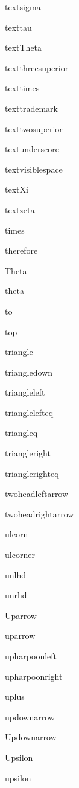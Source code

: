 \documentclass{article}
\begin{document}
textsigma    \textsigma{}

texttau    \texttau{}

textTheta    \textTheta{}

textthreesuperior    \textthreesuperior{}

texttimes    \texttimes{}

texttrademark    \texttrademark{}

texttwosuperior    \texttwosuperior{}

textunderscore    \textunderscore{}

textvisiblespace    \textvisiblespace{}

textXi    \textXi{}

textzeta    \textzeta{}

times    \times{}

therefore    \therefore{}

Theta    \Theta{}

theta    \theta{}

to    \to{}

top    \top{}

triangle    \triangle{}

triangledown    \triangledown{}

triangleleft    \triangleleft{}

trianglelefteq    \trianglelefteq{}

triangleq    \triangleq{}

triangleright    \triangleright{}

trianglerighteq    \trianglerighteq{}

twoheadleftarrow    \twoheadleftarrow{}

twoheadrightarrow    \twoheadrightarrow{}


ulcorn    \ulcorn{}

ulcorner    \ulcorner{}

unlhd    \unlhd{}

unrhd    \unrhd{}

Uparrow    \Uparrow{}

uparrow    \uparrow{}

upharpoonleft    \upharpoonleft{}

upharpoonright    \upharpoonright{}

uplus    \uplus{}

updownarrow    \updownarrow{}

Updownarrow    \Updownarrow{}

Upsilon    \Upsilon{}

upsilon    \upsilon{}
\end{document}
